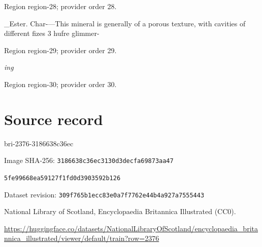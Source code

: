 \documentclass[11pt]{article}
\begin{document}
{\scriptsize\color{gray} Region region-28; provider order 28.\par}
\medskip

\_Ester. Char-—This mineral is generally of a porous
texture, with cavities of different fizes 3 hufre glimmer-
\par

{\scriptsize\color{gray} Region region-29; provider order 29.\par}
\medskip

{\small\itshape ing\par}

{\scriptsize\color{gray} Region region-30; provider order 30.\par}
\medskip
\newpage\section*{Source record}
bri-2376-3186638c36ec\par
Image SHA-256: \texttt{3186638c36ec3130d3decfa69873aa47}\par\texttt{5fe99668ea59127f1fd0d3903592b126}\par
Dataset revision: \texttt{309f765b1ecc83e0a7f7}\texttt{762e44b4a927a7555443}\par
National Library of Scotland, Encyclopaedia Britannica Illustrated (CC0).\par
\url{https://huggingface.co/datasets/NationalLibraryOfScotland/encyclopaedia_britannica_illustrated/viewer/default/train?row=2376}
\end{document}
